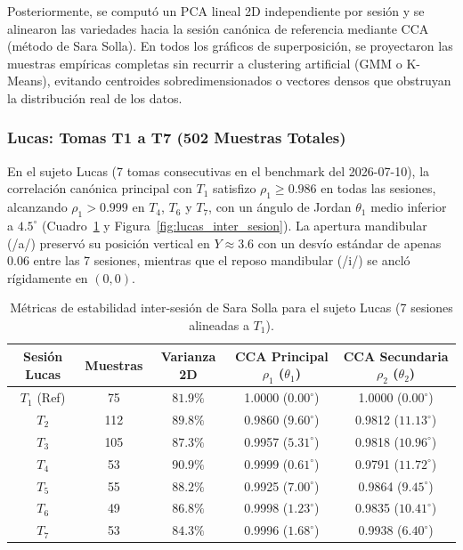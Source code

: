 \documentclass[11pt,a4paper]{article}
\begin{document}
Posteriormente, se computó un PCA lineal 2D independiente por sesión y se alinearon las variedades hacia la sesión canónica de referencia mediante CCA (método de Sara Solla). En todos los gráficos de superposición, se proyectaron las muestras empíricas completas sin recurrir a clustering artificial (GMM o K-Means), evitando centroides sobredimensionados o vectores densos que obstruyan la distribución real de los datos.

\subsubsection{Lucas: Tomas T1 a T7 (502 Muestras Totales)}
En el sujeto Lucas (7 tomas consecutivas en el benchmark del 2026-07-10), la correlación canónica principal con $T_1$ satisfizo $\rho_1 \ge 0.986$ en todas las sesiones, alcanzando $\rho_1 > 0.999$ en $T_4$, $T_6$ y $T_7$, con un ángulo de Jordan $\theta_1$ medio inferior a $4.5^\circ$ (Cuadro~\ref{tab:lucas_inter_sesion} y Figura~\ref{fig:lucas_inter_sesion}). La apertura mandibular (/a/) preservó su posición vertical en $Y \approx 3.6$ con un desvío estándar de apenas $0.06$ entre las 7 sesiones, mientras que el reposo mandibular (/i/) se ancló rígidamente en $(0,0)$.

\begin{table}[H]
\centering
\small
\begin{tabular}{ccccc}
\toprule
\textbf{Sesión Lucas} & \textbf{Muestras} & \textbf{Varianza 2D} & \textbf{CCA Principal $\rho_1$ ($\theta_1$)} & \textbf{CCA Secundaria $\rho_2$ ($\theta_2$)} \\
\midrule
$T_1$ (Ref) & 75 & $81.9\%$ & 1.0000 ($0.00^\circ$) & 1.0000 ($0.00^\circ$) \\
$T_2$ & 112 & $89.8\%$ & 0.9860 ($9.60^\circ$) & 0.9812 ($11.13^\circ$) \\
$T_3$ & 105 & $87.3\%$ & 0.9957 ($5.31^\circ$) & 0.9818 ($10.96^\circ$) \\
$T_4$ & 53 & $90.9\%$ & 0.9999 ($0.61^\circ$) & 0.9791 ($11.72^\circ$) \\
$T_5$ & 55 & $88.2\%$ & 0.9925 ($7.00^\circ$) & 0.9864 ($9.45^\circ$) \\
$T_6$ & 49 & $86.8\%$ & 0.9998 ($1.23^\circ$) & 0.9835 ($10.41^\circ$) \\
$T_7$ & 53 & $84.3\%$ & 0.9996 ($1.68^\circ$) & 0.9938 ($6.40^\circ$) \\
\bottomrule
\end{tabular}
\caption{Métricas de estabilidad inter-sesión de Sara Solla para el sujeto Lucas (7 sesiones alineadas a $T_1$).}
\label{tab:lucas_inter_sesion}
\end{table}
\end{document}
